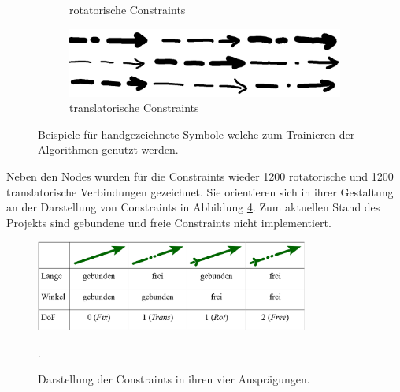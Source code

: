 \begin{figure}
\begin{subfigure}[b]{0.4\textwidth}
      \caption{rotatorische Constraints}
      \label{fig:rs}
    \end{subfigure}
    \begin{subfigure}[b]{0.4\textwidth}
      \includegraphics[width=\textwidth]{images/ts.png}
      \caption{translatorische Constraints}
      \label{fig:ts}
    \end{subfigure}
    \caption{Beispiele für handgezeichnete Symbole welche zum Trainieren der Algorithmen genutzt werden.}
    \label{fig:example_symbols}
\end{figure}

Neben den Nodes wurden für die Constraints wieder 1200 rotatorische und 1200 translatorische Verbindungen gezeichnet.
Sie orientieren sich in ihrer Gestaltung an der Darstellung von Constraints in Abbildung \ref{fig:constraints_gtk}.
Zum aktuellen Stand des Projekts sind gebundene und freie Constraints nicht implementiert.

\begin{figure}
  \centering
  \includegraphics[width=0.8\textwidth]{images/gtk2019_tab1.png}
  \caption{Darstellung der Constraints in ihren vier Ausprägungen.}.
  \label{fig:constraints_gtk}
\end{figure}
